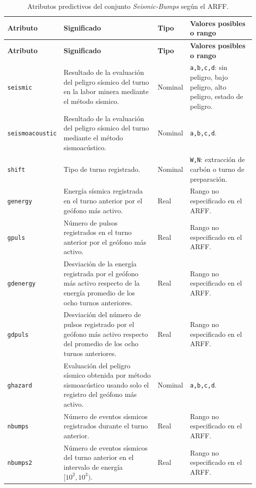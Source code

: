 \documentclass[12pt,a4paper]{article}
\begin{document}
{\footnotesize
\setlength{\tabcolsep}{3pt}
\begin{longtable}{@{}p{}p{}p{}p{}@{}}
\caption{Atributos predictivos del conjunto \textit{Seismic-Bumps} según el ARFF.}\label{tab:attributes}\\
\toprule
\textbf{Atributo} & \textbf{Significado} & \textbf{Tipo} & \textbf{Valores posibles o rango} \\
\midrule
\endfirsthead
\toprule
\textbf{Atributo} & \textbf{Significado} & \textbf{Tipo} & \textbf{Valores posibles o rango} \\
\midrule
\endhead
\bottomrule
\endfoot
\texttt{seismic} & Resultado de la evaluación del peligro sísmico del turno en la labor minera mediante el método sísmico. & Nominal & \texttt{a,b,c,d}: sin peligro, bajo peligro, alto peligro, estado de peligro. \\
\texttt{seismoacoustic} & Resultado de la evaluación del peligro sísmico del turno mediante el método sismoacústico. & Nominal & \texttt{a,b,c,d}. \\
\texttt{shift} & Tipo de turno registrado. & Nominal & \texttt{W,N}: extracción de carbón o turno de preparación. \\
\texttt{genergy} & Energía sísmica registrada en el turno anterior por el geófono más activo. & Real & Rango no especificado en el ARFF. \\
\texttt{gpuls} & Número de pulsos registrados en el turno anterior por el geófono más activo. & Real & Rango no especificado en el ARFF. \\
\texttt{gdenergy} & Desviación de la energía registrada por el geófono más activo respecto de la energía promedio de los ocho turnos anteriores. & Real & Rango no especificado en el ARFF. \\
\texttt{gdpuls} & Desviación del número de pulsos registrado por el geófono más activo respecto del promedio de los ocho turnos anteriores. & Real & Rango no especificado en el ARFF. \\
\texttt{ghazard} & Evaluación del peligro sísmico obtenida por método sismoacústico usando solo el registro del geófono más activo. & Nominal & \texttt{a,b,c,d}. \\
\texttt{nbumps} & Número de eventos sísmicos registrados durante el turno anterior. & Real & Rango no especificado en el ARFF. \\
\texttt{nbumps2} & Número de eventos sísmicos del turno anterior en el intervalo de energía $[10^2,10^3)$. & Real & Rango no especificado en el ARFF. \\

\end{longtable}}
\end{document}
